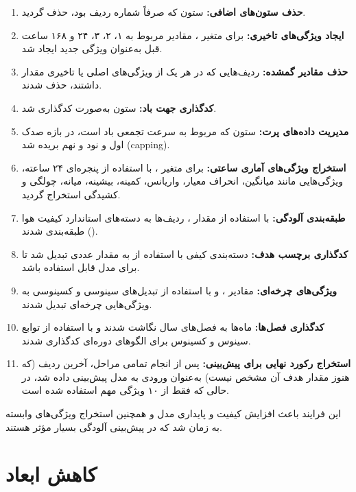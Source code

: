 \documentclass{article}
\begin{document}
\begin{enumerate}
	\item \textbf{حذف ستون‌های اضافی:} ستون  که صرفاً شماره ردیف بود، حذف گردید.
	\item \textbf{ایجاد ویژگی‌های تاخیری:} برای متغیر ، مقادیر مربوط به ۱، ۲، ۳، ۲۴ و ۱۶۸ ساعت قبل به‌عنوان ویژگی جدید ایجاد شد.
	\item \textbf{حذف مقادیر گمشده:} ردیف‌هایی که در هر یک از ویژگی‌های اصلی یا تاخیری مقدار  داشتند، حذف شدند.
	\item \textbf{کدگذاری جهت باد:} ستون  به‌صورت  کدگذاری شد.
	\item \textbf{مدیریت داده‌های پرت:} ستون  که مربوط به سرعت تجمعی باد است، در بازه صدک اول و نود و نهم بریده شد (capping).
	\item \textbf{استخراج ویژگی‌های آماری ساعتی:} برای متغیر ، با استفاده از پنجره‌ای ۲۴ ساعته، ویژگی‌هایی مانند میانگین، انحراف معیار، واریانس، کمینه، بیشینه، میانه، چولگی و کشیدگی استخراج گردید.
	\item \textbf{طبقه‌بندی آلودگی:} با استفاده از مقدار ، ردیف‌ها به دسته‌های استاندارد کیفیت هوا طبقه‌بندی شدند ().
	\item \textbf{کدگذاری برچسب هدف:} دسته‌بندی کیفی با استفاده از  به مقدار عددی تبدیل شد تا برای مدل قابل استفاده باشد.
	\item \textbf{ویژگی‌های چرخه‌ای:} مقادیر ،  و  با استفاده از تبدیل‌های سینوسی و کسینوسی به ویژگی‌هایی چرخه‌ای تبدیل شدند.
	\item \textbf{کدگذاری فصل‌ها:} ماه‌ها به فصل‌های سال نگاشت شدند و با استفاده از توابع سینوس و کسینوس برای الگوهای دوره‌ای کدگذاری شدند.
	\item \textbf{استخراج رکورد نهایی برای پیش‌بینی:} پس از انجام تمامی مراحل، آخرین ردیف (که هنوز مقدار هدف آن مشخص نیست) به‌عنوان ورودی به مدل پیش‌بینی داده شد، در حالی که فقط از ۱۰ ویژگی مهم استفاده شده است.
\end{enumerate}

این فرایند باعث افزایش کیفیت و پایداری مدل و همچنین استخراج ویژگی‌های وابسته به زمان شد که در پیش‌بینی آلودگی بسیار مؤثر هستند.













\newpage

\section{کاهش ابعاد}
\end{document}
